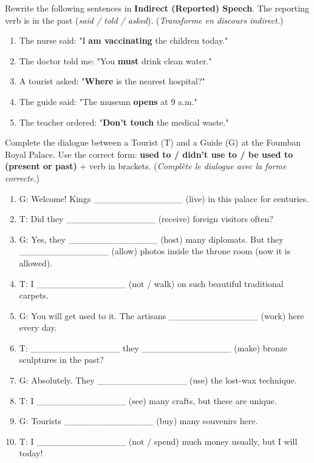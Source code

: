 \documentclass[11pt]{article}
\newcounter{popsec}
\newcounter{popsub}
\newcommand{\courssub}[1]{%
  \stepcounter{popsub}%
  \par\vspace{9pt}\noindent{\popxbold\fontsize{11.5}{13}\selectfont\color{popink}{\color{poporange}\thepopsec.\thepopsub}\hspace{6pt}#1}\par\nopagebreak\vspace{4pt}
}
\begin{document}
\begin{exercice}
Rewrite the following sentences in \textbf{Indirect (Reported) Speech}. The reporting verb is in the past (\textit{said / told / asked}). (\emph{Transforme en discours indirect.})
\begin{enumerate}
    \item The nurse said: "I \textbf{am vaccinating} the children today."
    \item The doctor told me: "You \textbf{must} drink clean water."
    \item A tourist asked: "\textbf{Where} is the nearest hospital?"
    \item The guide said: "The museum \textbf{opens} at 9 a.m."
    \item The teacher ordered: "\textbf{Don't touch} the medical waste."
\end{enumerate}
\end{exercice}

\courssub{Je m'entraîne}

\begin{exercice}
Complete the dialogue between a Tourist (T) and a Guide (G) at the Foumban Royal Palace. Use the correct form: \textbf{used to / didn't use to / be used to (present or past)} + verb in brackets. (\emph{Complète le dialogue avec la forme correcte.})
\begin{enumerate}
    \item G: Welcome! Kings \_\_\_\_\_\_\_\_\_\_\_\_\_\_ (live) in this palace for centuries.
    \item T: Did they \_\_\_\_\_\_\_\_\_\_\_\_\_\_ (receive) foreign visitors often?
    \item G: Yes, they \_\_\_\_\_\_\_\_\_\_\_\_\_\_ (host) many diplomats. But they \_\_\_\_\_\_\_\_\_\_\_\_\_\_ (allow) photos inside the throne room (now it is allowed).
    \item T: I \_\_\_\_\_\_\_\_\_\_\_\_\_\_ (not / walk) on such beautiful traditional carpets.
    \item G: You will get used to it. The artisans \_\_\_\_\_\_\_\_\_\_\_\_\_\_ (work) here every day.
    \item T: \_\_\_\_\_\_\_\_\_\_\_\_\_\_ they \_\_\_\_\_\_\_\_\_\_\_\_\_\_ (make) bronze sculptures in the past?
    \item G: Absolutely. They \_\_\_\_\_\_\_\_\_\_\_\_\_\_ (use) the lost-wax technique.
    \item T: I \_\_\_\_\_\_\_\_\_\_\_\_\_\_ (see) many crafts, but these are unique.
    \item G: Tourists \_\_\_\_\_\_\_\_\_\_\_\_\_\_ (buy) many souvenirs here.
    \item T: I \_\_\_\_\_\_\_\_\_\_\_\_\_\_ (not / spend) much money usually, but I will today!
\end{enumerate}
\end{exercice}
\end{document}

